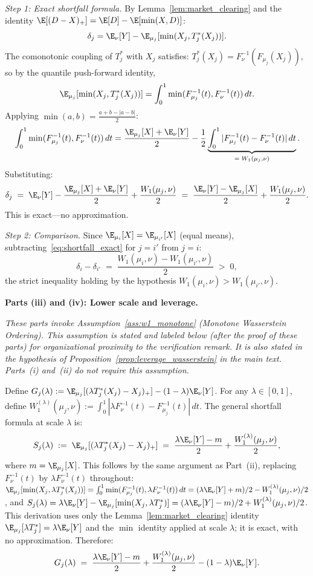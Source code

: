 \emph{Step 1: Exact shortfall formula.}
By Lemma~\ref{lem:market_clearing} and the identity $\E[(D-X)_+] = \E[D] - \E[\min(X,D)]$:
\[
  \delta_j = \E_\nu[Y] - \E_{\mu_j}[\min(X_j,T_j^*(X_j))].
\]
The comonotonic coupling of $T_j^*$ with $X_j$ satisfies: $T_j^*(X_j) = F_\nu^{-1}(F_{\mu_j}(X_j))$, so by the quantile push-forward identity,
\[
  \E_{\mu_j}[\min(X_j,T_j^*(X_j))] = \int_0^1 \min(F_{\mu_j}^{-1}(t), F_\nu^{-1}(t))\,dt.
\]
Applying $\min(a,b) = \frac{a+b-|a-b|}{2}$:
\[
  \int_0^1 \min(F_{\mu_j}^{-1}(t), F_\nu^{-1}(t))\,dt = \frac{\E_{\mu_j}[X]+\E_\nu[Y]}{2} - \frac{1}{2}\underbrace{\int_0^1 |F_{\mu_j}^{-1}(t)-F_\nu^{-1}(t)|\,dt}_{=\;W_1(\mu_j,\nu)}.
\]
Substituting:
\begin{equation}
  \delta_j \;=\; \E_\nu[Y] - \frac{\E_{\mu_j}[X]+\E_\nu[Y]}{2} + \frac{W_1(\mu_j,\nu)}{2} \;=\; \frac{\E_\nu[Y]-\E_{\mu_j}[X]}{2} + \frac{W_1(\mu_j,\nu)}{2}.
  \label{eq:shortfall_exact}
\end{equation}
This is exact—no approximation.

\emph{Step 2: Comparison.}
Since $\E_{\mu_i}[X] = \E_{\mu_{i'}}[X]$ (equal means), subtracting~\eqref{eq:shortfall_exact} for $j=i'$ from $j=i$:
\[
  \delta_i - \delta_{i'} \;=\; \frac{W_1(\mu_i,\nu) - W_1(\mu_{i'},\nu)}{2} \;>\; 0,
\]
the strict inequality holding by the hypothesis $W_1(\mu_i,\nu) > W_1(\mu_{i'},\nu)$.

\textbf{Parts (iii) and (iv): Lower scale and leverage.}

\emph{These parts invoke Assumption~\ref{ass:w1_monotone} (Monotone Wasserstein Ordering). This assumption is stated and labeled below (after the proof of these parts) for organizational proximity to the verification remark. It is also stated in the hypothesis of Proposition~\ref{prop:leverage_wasserstein} in the main text. Parts~(i) and~(ii) do not require this assumption.}

Define $G_j(\lambda) := \E_{\mu_j}[(\lambda T_j^*(X_j)-X_j)_+] - (1-\lambda)\E_\nu[Y]$. For any $\lambda \in [0,1]$, define $W_1^{(\lambda)}(\mu_j,\nu) := \int_0^1|\lambda F_\nu^{-1}(t) - F_{\mu_j}^{-1}(t)|\,dt$. The general shortfall formula at scale $\lambda$ is:
\[
  S_j(\lambda) \;:=\; \E_{\mu_j}[(\lambda T_j^*(X_j)-X_j)_+] \;=\; \frac{\lambda\E_\nu[Y]-m}{2} + \frac{W_1^{(\lambda)}(\mu_j,\nu)}{2},
\]
where $m = \E_{\mu_j}[X]$. This follows by the same argument as Part~(ii), replacing $F_\nu^{-1}(t)$ by $\lambda F_\nu^{-1}(t)$ throughout: $\E_{\mu_j}[\min(X_j, \lambda T_j^*(X_j))] = \int_0^1 \min(F_{\mu_j}^{-1}(t), \lambda F_\nu^{-1}(t))\,dt = (\lambda\E_\nu[Y]+m)/2 - W_1^{(\lambda)}(\mu_j,\nu)/2$, and $S_j(\lambda) = \lambda\E_\nu[Y] - \E_{\mu_j}[\min(X_j, \lambda T_j^*)] = (\lambda\E_\nu[Y]-m)/2 + W_1^{(\lambda)}(\mu_j,\nu)/2$. This derivation uses only the Lemma~\ref{lem:market_clearing} identity $\E_{\mu_j}[\lambda T_j^*] = \lambda\E_\nu[Y]$ and the $\min$ identity applied at scale $\lambda$; it is exact, with no approximation. Therefore:
\begin{equation}
  G_j(\lambda) \;=\; \frac{\lambda\E_\nu[Y]-m}{2} + \frac{W_1^{(\lambda)}(\mu_j,\nu)}{2} - (1-\lambda)\E_\nu[Y].
  \label{eq:Gj_formula}
\end{equation}

